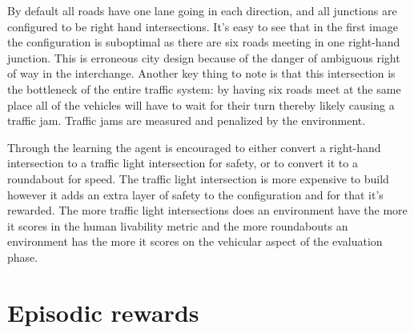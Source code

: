 \documentclass[
]{elteikthesis}[2023/04/10]
\begin{document}
By default all roads have one lane going in each direction, and all
junctions are configured to be right hand intersections. It's easy
to see that in the first image the configuration is suboptimal as
there are six roads meeting in one right-hand junction. This is erroneous
city design because of the danger of ambiguous right of way in the
interchange. Another key thing to note is that this intersection is
the bottleneck of the entire traffic system: by having six roads meet
at the same place all of the vehicles will have to wait for their
turn thereby likely causing a traffic jam. Traffic jams are measured
and penalized by the environment. 

Through the learning the agent is encouraged to either convert a right-hand
intersection to a traffic light intersection for safety, or to convert
it to a roundabout for speed. The traffic light intersection is more
expensive to build however it adds an extra layer of safety to the
configuration and for that it's rewarded. The more traffic light intersections
does an environment have the more it scores in the human livability
metric and the more roundabouts an environment has the more it scores
on the vehicular aspect of the evaluation phase. 

\section{Episodic rewards}
\end{document}
